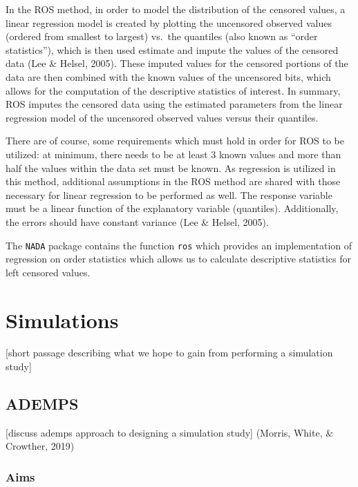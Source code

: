 \documentclass[12pt, twoside]{amherstthesis}
\begin{document}
In the ROS method, in order to model the distribution of the censored values, a linear regression model is created by plotting the uncensored observed values (ordered from smallest to largest) vs.~the quantiles (also known as ``order statistics''), which is then used estimate and impute the values of the censored data (Lee \& Helsel, 2005). These imputed values for the censored portions of the data are then combined with the known values of the uncensored bits, which allows for the computation of the descriptive statistics of interest. In summary, ROS imputes the censored data using the estimated parameters from the linear regression model of the uncensored observed values versus their quantiles.

There are of course, some requirements which must hold in order for ROS to be utilized: at minimum, there needs to be at least 3 known values and more than half the values within the data set must be known. As regression is utilized in this method, additional assumptions in the ROS method are shared with those necessary for linear regression to be performed as well. The response variable must be a linear function of the explanatory variable (quantiles). Additionally, the errors should have constant variance (Lee \& Helsel, 2005).

The \texttt{NADA} package contains the function \texttt{ros} which provides an implementation of regression on order statistics which allows us to calculate descriptive statistics for left censored values.

\hypertarget{simulations}{%
\chapter{Simulations}\label{simulations}}

{[}short passage describing what we hope to gain from performing a simulation study{]}

\hypertarget{ademps}{%
\section{ADEMPS}\label{ademps}}

{[}discuss ademps approach to designing a simulation study{]} (Morris, White, \& Crowther, 2019)

\hypertarget{aims}{%
\subsection{Aims}\label{aims}}
\end{document}
